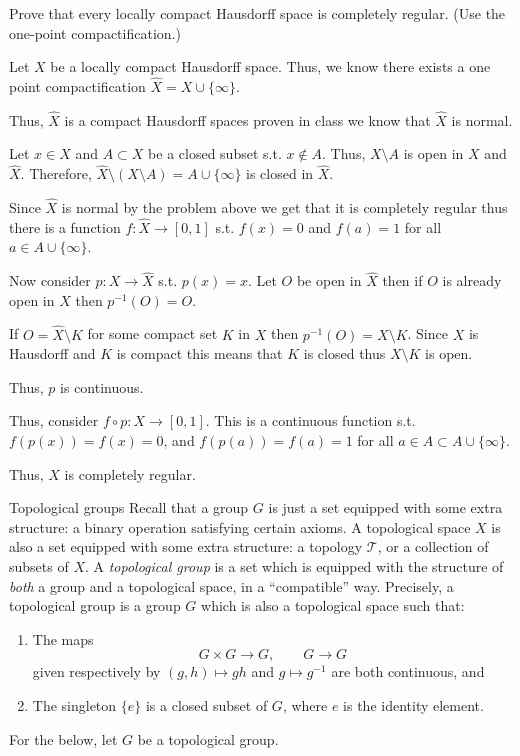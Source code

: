 \documentclass[12pt, letterpaper]{article}
\newcommand{\T}{\mathcal{T}}
\begin{document}
\begin{subproblem}{}
    Prove that every locally compact Hausdorff space is
completely regular. (Use the one-point compactification.)
\end{subproblem}
\begin{problemproof}
    Let $X$ be a locally compact Hausdorff space. Thus, we know there exists a one point compactification $\hat{X}=X \cup \{\infty\}$.

    Thus, $\hat{X}$ is a compact Hausdorff spaces proven in class we know that $\hat{X}$ is normal.

    Let $x \in X$ and $A \subset X$ be a closed subset s.t. $x \notin A$. Thus, $X \setminus A$ is open in $X$ and $\hat{X}$. Therefore, $\hat{X} \setminus (X \setminus A)=A \cup \{\infty\}$ is closed in $\hat{X}$.

    Since $\hat{X}$ is normal by the problem above we get that it is completely regular thus there is a function $f: \hat{X} \to [0,1]$ s.t. $f(x)=0$ and $f(a)=1$ for all $a \in A \cup \{\infty\}$.

    Now consider $p: X \to \hat{X}$ s.t. $p(x)=x$. Let $O$ be open in $\hat{X}$ then if $O$ is already open in $X$ then $p^{-1}(O)=O$.
    
    If $O=\hat{X} \setminus K$ for some compact set $K$ in $X$ then $p^{-1}(O)=X \setminus K$. Since $X$ is Hausdorff and $K$ is compact this means that $K$ is closed thus $X \setminus K$ is open.

    Thus, $p$ is continuous.

    Thus, consider $f \circ p: X \to [0,1]$. This is a continuous function s.t. $f(p(x))=f(x)=0$, and $f(p(a))=f(a)=1$ for all $a \in A \subset A \cup \{\infty\}$.

    Thus, $X$ is completely regular.
\end{problemproof}

\begin{problem}{Topological groups}
    Recall that a group $G$ is just a set equipped with some extra
structure: a binary operation satisfying certain axioms. A
topological space $X$ is also a set equipped with some extra
structure: a topology $\T$, or a collection of subsets of $X$.
A \emph{topological group} is a set which is equipped with the
structure of \emph{both} a group and a topological space, in a
``compatible'' way. Precisely, a topological group is a group $G$
which is also a topological space such that:
\begin{enumerate}[I]
    \item The maps
    \[
    G \times G \to G, \qquad G \to G
    \]
    given respectively by $(g, h) \mapsto gh$ and $g \mapsto g^{-1}$
    are both continuous, and
    \item The singleton $\{e\}$ is a closed subset of $G$, where $e$
    is the identity element.
\end{enumerate}
For the below, let $G$ be a topological group.
\end{problem}
\end{document}
